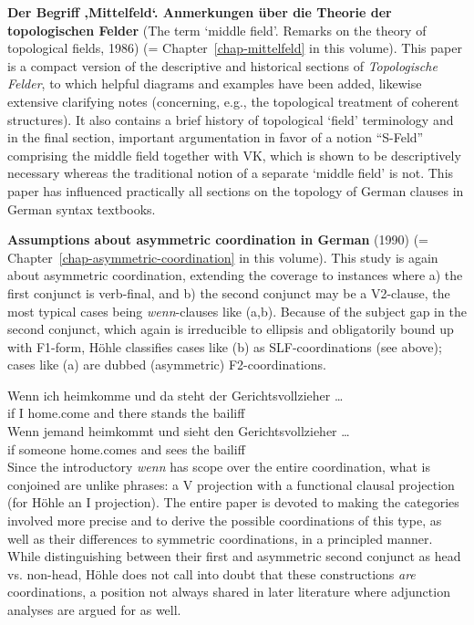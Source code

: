 \begin{refsection}
\textbf{Der Begriff ‚Mittelfeld‘. Anmerkungen über die Theorie der topologischen Felder} (The term `middle field'. Remarks on the theory of topological fields, 1986) (= Chapter~\ref{chap-mittelfeld} in this volume). This paper is a compact version of the descriptive and historical sections of \emph{Topologische Felder}, to which helpful diagrams and examples have been added, likewise extensive clarifying notes (concerning, e.g., the topological treatment of coherent structures). It also contains a brief history of topological `field' terminology and in the final section, important argumentation in favor of a notion ``S-Feld'' comprising the middle field together with VK, which is shown to be descriptively necessary whereas the traditional notion of a separate `middle field' is not. This paper has influenced practically all sections on the topology of German clauses in German syntax textbooks. 

\textbf{Assumptions about asymmetric coordination in German} (1990) (=
Chapter~\ref{chap-asymmetric-coordination} in this volume). This study 
is again about asymmetric coordination, extending the coverage to instances where a) the first conjunct is verb-final, and b) the second conjunct may be a V2-clause, the most typical cases being \emph{wenn}-clauses like (a,b). Because of the subject gap in the second conjunct, which again is irreducible to ellipsis and obligatorily bound up with F1-form, 
Höhle classifies cases like (b) as SLF-coordinations (see above); cases like (a) are dubbed (asymmetric) F2-coordinations. 

\eal
\ex
\gll  Wenn ich heimkomme und  da      steht   der Gerichtsvollzieher \ldots\\
      if   I   home.come and there  stands the bailiff \\
\ex
\gll  Wenn jemand   heimkommt  und sieht den Gerichtsvollzieher \ldots\\
      if   someone  home.comes and sees  the bailiff\\
\zl
%
Since the introductory \emph{wenn} has scope over the entire coordination, what is conjoined are unlike phrases: a V projection with a functional clausal projection (for Höhle an I projection). The entire paper is devoted to making the categories involved more precise and to derive the possible coordinations of this type, as well as their differences to symmetric coordinations, in a principled manner. While distinguishing between their first and asymmetric second conjunct as head vs. non-head, Höhle does not call into doubt that these constructions \emph{are} coordinations, a position not always shared in later literature where adjunction analyses are argued for as well.  


\end{refsection}
